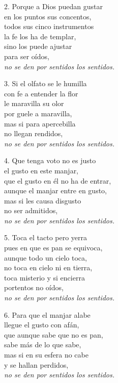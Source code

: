 \def\tagline{\emph{no se den por sentidos los sentidos.}}

\begin{blocklyrics}
2. Porque a Dios puedan gustar\\
en los puntos sus concentos,\\
todos sus cinco instrumentos\\
la fe los ha de templar,\\
sino los puede ajustar\\
para ser oídos,\\
\tagline

3. Si el olfato se le humilla\\
con fe a entender la flor\\ 
le maravilla su olor\\
por guele a maravilla,\\
mas si para apercebilla\\
no llegan rendidos,\\
\tagline

4. Que tenga voto no es justo\\
el gusto en este manjar,\\
que el gusto en él no ha de entrar,\\
aunque el manjar entre en gusto,\\
mas si les causa disgusto\\
no ser admitidos,\\
\tagline

5. Toca el tacto pero yerra\\%
pues en que es pan se equivoca,\\
aunque todo un cielo toca,\\
no toca en cielo ni en tierra,\\
toca misterio y si encierra\\
portentos no oídos,\\
\tagline

6. Para que el manjar alabe\\
llegue el gusto con afán,\\
que aunque sabe que no es pan,\\
sabe más de lo que sabe,\\
mas si en su esfera no cabe\\
y se hallan perdidos,\\
\tagline
\end{blocklyrics}
